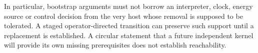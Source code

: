 In particular, bootstrap arguments must not borrow an interpreter, clock, energy source or control decision from the very host whose removal is supposed to be tolerated. A staged operator-directed transition can preserve such support until a replacement is established. A circular statement that a future independent kernel will provide its own missing prerequisites does not establish reachability.
